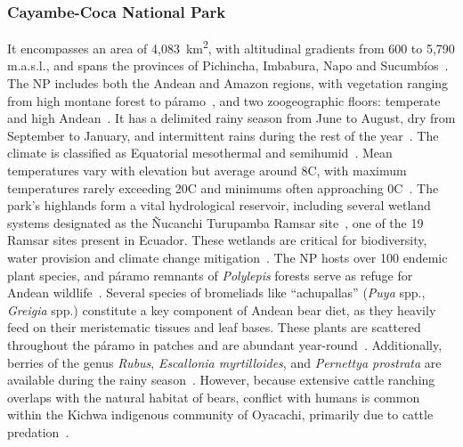 \documentclass[lineno,referee,pdflatex,sn-vancouver-num]{sn-jnl}%
\theoremstyle{thmstyleone}%
\theoremstyle{thmstyletwo}%
\theoremstyle{thmstylethree}%
\begin{document}
\subsubsection{Cayambe-Coca National Park}

It encompasses an area of 4,083~km\textsuperscript{2}, with altitudinal gradients from 600 to 5,790 m.a.s.l., and spans the provinces of Pichincha, Imbabura, Napo and Sucumb\'{i}os~\cite{ministeriodelambientePlanManejoParque2020}.
The NP includes both the Andean and Amazon regions, with vegetation ranging from high montane forest to páramo~\cite{sierraPropuestaPreliminarSistema1999}, and two zoogeographic floors: temperate and high Andean~\cite{albujaFaunaVertebradosEcuador2012}.
It has a delimited rainy season from June to August, dry from September to January, and intermittent rains during the rest of the year~\cite{hijmansVeryHighResolution2005,varelaGeografiaClimaEcuador2018}.
The climate is classified as Equatorial mesothermal and semihumid~\cite{hijmansVeryHighResolution2005,varelaGeografiaClimaEcuador2018}. Mean temperatures vary with elevation but average around 8{\textdegree}C, with maximum temperatures rarely exceeding 20{\textdegree}C and minimums often approaching 0{\textdegree}C~\cite{ministeriodelambientePlanManejoParque2020}.
The park's highlands form a vital hydrological reservoir, including several wetland systems designated as the \~{N}ucanchi Turupamba Ramsar site~\cite{ministeriodelambientePlanManejoParque2020}, one of the 19 Ramsar sites present in Ecuador. These wetlands are critical for biodiversity, water provision and climate change mitigation~\cite{ministeriodelambientePlanManejoParque2020}.
The NP hosts over 100 endemic plant species, and páramo remnants of \textit{Polylepis} forests serve as refuge for Andean wildlife~\cite{ministeriodelambientePlanManejoParque2020}. Several species of bromeliads like ``achupallas'' (\textit{Puya} spp., \textit{Greigia} spp.) constitute a key component of Andean bear diet, as they heavily feed on their meristematic tissues and leaf bases.
These plants are scattered throughout the páramo in patches and are abundant year-round~\cite{troyaFoodHabitsAndean2004}. Additionally, berries of the genus \textit{Rubus}, \textit{Escallonia myrtilloides}, and \textit{Pernettya prostrata} are available during the rainy season~\cite{troyaFoodHabitsAndean2004}.
However, because extensive cattle ranching overlaps with the natural habitat of bears, conflict with humans is common within the Kichwa indigenous community of Oyacachi, primarily due to cattle predation~\cite{floresvelascoEnvironmentalEducationTool2004}.
\end{document}
